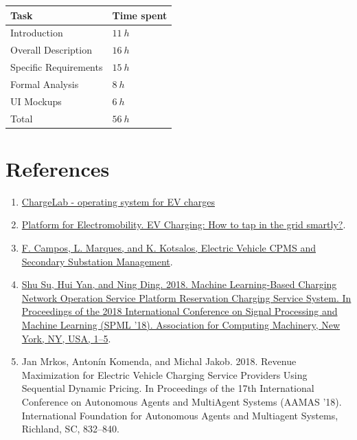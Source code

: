 \documentclass[11pt]{article}
\begin{document}
\begin{tabular}{|l|l|}
    \hline
    \textbf{Task} & \textbf{Time spent} \\
    \hline
    Introduction & $11\ h $ \\
    \hline
    Overall Description & $16\ h$ \\
    \hline
    Specific Requirements & $15\ h$ \\
    \hline
    Formal Analysis & $8\ h$ \\
    \hline
    UI Mockups & $6\ h$ \\
    \hline
    \hline
    Total & $56\ h$ \\
    \hline
\end{tabular}

\newpage

\section{References}
\label{section:references}

\begin{enumerate}
    \item \href{https://www.chargelab.co/}{ChargeLab - operating system for EV charges}
    \item \href{https://www.platformelectromobility.eu/2022/05/17/ev-charging-how-to-tap-in-the-grid-smartly/}{Platform for Electromobility. EV Charging: How to tap in the grid smartly?}.
    \item \href{https://mobilityintegrationsymposium.org/wp-content/uploads/sites/10/2018/11/4A_3_Emob18_024_paper_Filipe_Campos.pdf}{F. Campos, L. Marques, and K. Kotsalos, Electric Vehicle CPMS and Secondary Substation Management}.
    \item \href{https://doi.org/10.1145/3297067.3297078}{Shu Su, Hui Yan, and Ning Ding. 2018. Machine Learning-Based Charging Network Operation Service Platform Reservation Charging Service System. In Proceedings of the 2018 International Conference on Signal Processing and Machine Learning (SPML '18). Association for Computing Machinery, New York, NY, USA, 1–5}.
    \item Jan Mrkos, Antonín Komenda, and Michal Jakob. 2018. Revenue Maximization for Electric Vehicle Charging Service Providers Using Sequential Dynamic Pricing. In Proceedings of the 17th International Conference on Autonomous Agents and MultiAgent Systems (AAMAS '18). International Foundation for Autonomous Agents and Multiagent Systems, Richland, SC, 832–840.
\end{enumerate}
\end{document}
